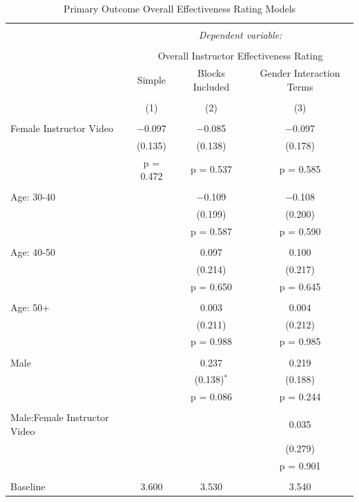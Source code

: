 \documentclass[
]{article}
\begin{document}
\begin{table}[!htbp] \centering 
  \caption{Primary Outcome Overall Effectiveness Rating Models} 
  \label{} 
\small 
\begin{tabular}{@{\extracolsep{3pt}}lccc} 
\\[-1.8ex]\hline 
\hline \\[-1.8ex] 
 & \multicolumn{3}{c}{\textit{Dependent variable:}} \\ 
\cline{2-4} 
\\[-1.8ex] & \multicolumn{3}{c}{Overall Instructor Effectiveness Rating} \\ 
 & Simple & Blocks Included & Gender Interaction Terms \\ 
\\[-1.8ex] & (1) & (2) & (3)\\ 
\hline \\[-1.8ex] 
 Female Instructor Video & $-$0.097 & $-$0.085 & $-$0.097 \\ 
  & (0.135) & (0.138) & (0.178) \\ 
  & p = 0.472 & p = 0.537 & p = 0.585 \\ 
  & & & \\ 
 Age: 30-40 &  & $-$0.109 & $-$0.108 \\ 
  &  & (0.199) & (0.200) \\ 
  &  & p = 0.587 & p = 0.590 \\ 
  & & & \\ 
 Age: 40-50 &  & 0.097 & 0.100 \\ 
  &  & (0.214) & (0.217) \\ 
  &  & p = 0.650 & p = 0.645 \\ 
  & & & \\ 
 Age: 50+ &  & 0.003 & 0.004 \\ 
  &  & (0.211) & (0.212) \\ 
  &  & p = 0.988 & p = 0.985 \\ 
  & & & \\ 
 Male &  & 0.237 & 0.219 \\ 
  &  & (0.138)$^{*}$ & (0.188) \\ 
  &  & p = 0.086 & p = 0.244 \\ 
  & & & \\ 
 Male:Female Instructor Video &  &  & 0.035 \\ 
  &  &  & (0.279) \\ 
  &  &  & p = 0.901 \\ 
  & & & \\ 
 Baseline & 3.600 & 3.530 & 3.540 \\ 

\end{tabular}
\end{table}
\end{document}
